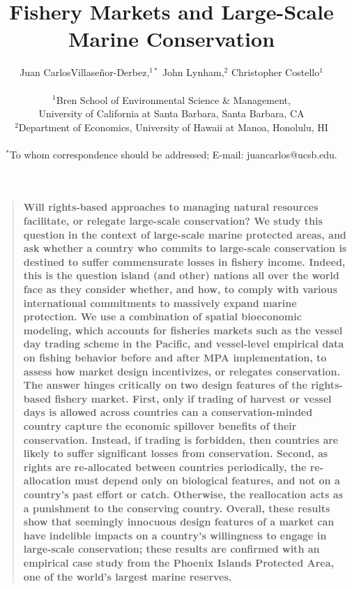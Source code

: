 \documentclass[12pt]{article}
\title{Fishery Markets and Large-Scale Marine Conservation}
\author{Juan CarlosVillase\~{n}or-Derbez,$^{1\ast}$ John Lynham,$^{2}$ Christopher Costello$^{1}$\\
\\
\normalsize{$^{1}$Bren School of Environmental Science \& Management,}\\
\normalsize{University of California at Santa Barbara, Santa Barbara, CA}\\
\normalsize{$^{2}$Department of Economics, University of Hawaii at Manoa, Honolulu, HI}\\
\\
\normalsize{$^\ast$To whom correspondence should be addressed; E-mail: juancarlos@ucsb.edu.}
}
\date{}
\newenvironment{sciabstract}{%
\begin{quote} \bf}
{\end{quote}}
\begin{document}

\baselineskip24pt


\maketitle




\begin{sciabstract}
Will rights-based approaches to managing natural resources facilitate, or relegate large-scale conservation? We study this question in the context of large-scale marine protected areas, and ask whether a country who commits to large-scale conservation is destined to suffer commensurate losses in fishery income.  Indeed, this is the question island (and other) nations all over the world face as they consider whether, and how, to comply with various international commitments to massively expand marine protection. We use a combination of spatial bioeconomic modeling, which accounts for fisheries markets such as the vessel day trading scheme in the Pacific, and vessel-level empirical data on fishing behavior before and after MPA implementation, to assess how market design incentivizes, or relegates conservation. The answer hinges critically on two design features of the rights-based fishery market. First, only if trading of harvest or vessel days is allowed across countries can a conservation-minded country capture the economic spillover benefits of their conservation.  Instead, if trading is forbidden, then countries are likely to suffer significant losses from conservation. Second, as rights are re-allocated between countries periodically, the re-allocation must depend only on biological features, and not on a country's past effort or catch. Otherwise, the reallocation acts as a punishment to the conserving country. Overall, these results show that seemingly innocuous design features of a market can have indelible impacts on a country's willingness to engage in large-scale conservation; these results are confirmed with an empirical case study from the Phoenix Islands Protected Area, one of the world's largest marine reserves.
\end{sciabstract}

\end{document}
